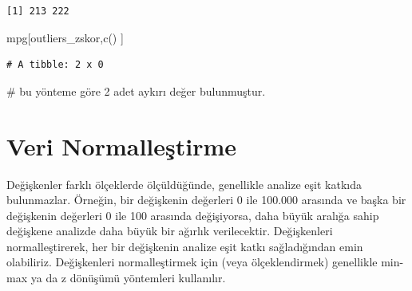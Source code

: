\documentclass[
  letterpaper,
  DIV=11,
  numbers=noendperiod]{scrreprt}
\newenvironment{Shaded}{\begin{snugshade}}{\end{snugshade}}
\newcommand{\CommentTok}[1]{\textcolor[rgb]{0.37,0.37,0.37}{#1}}
\newcommand{\FunctionTok}[1]{\textcolor[rgb]{0.28,0.35,0.67}{#1}}
\newcommand{\NormalTok}[1]{\textcolor[rgb]{0.00,0.23,0.31}{#1}}
\begin{document}
\begin{verbatim}
[1] 213 222
\end{verbatim}

\begin{Shaded}
\begin{Highlighting}[]
\NormalTok{mpg[outliers\_zskor,}\FunctionTok{c}\NormalTok{() ]}
\end{Highlighting}
\end{Shaded}

\begin{verbatim}
# A tibble: 2 x 0
\end{verbatim}

\begin{Shaded}
\begin{Highlighting}[]
\CommentTok{\# bu yönteme göre 2 adet aykırı değer bulunmuştur.}
\end{Highlighting}
\end{Shaded}

\hypertarget{veri-normalleux15ftirme}{%
\section*{Veri Normalleştirme}\label{veri-normalleux15ftirme}}


Değişkenler farklı ölçeklerde ölçüldüğünde, genellikle analize eşit
katkıda bulunmazlar. Örneğin, bir değişkenin değerleri 0 ile 100.000
arasında ve başka bir değişkenin değerleri 0 ile 100 arasında
değişiyorsa, daha büyük aralığa sahip değişkene analizde daha büyük bir
ağırlık verilecektir. Değişkenleri normalleştirerek, her bir değişkenin
analize eşit katkı sağladığından emin olabiliriz. Değişkenleri
normalleştirmek için (veya ölçeklendirmek) genellikle min-max ya da z
dönüşümü yöntemleri kullanılır.
\end{document}
